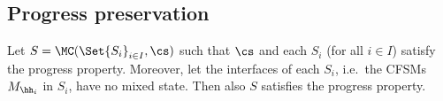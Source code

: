 
\subsection{Progress preservation}


\begin{proposition}%
\label{lem:restrRS}
Let $S = \MC(\Set{S_i}_{i\in I}, \cs)$ such that $\cs$ and each $S_i$ (for all $i\in I$) satisfy 
the progress property. 
 Moreover, let the interfaces of each $S_i$,
i.e.\ the CFSMs $M_{\hh_i}$ in $S_i$, have no mixed state.
Then also $S$ satisfies the progress property. 
\end{proposition}

